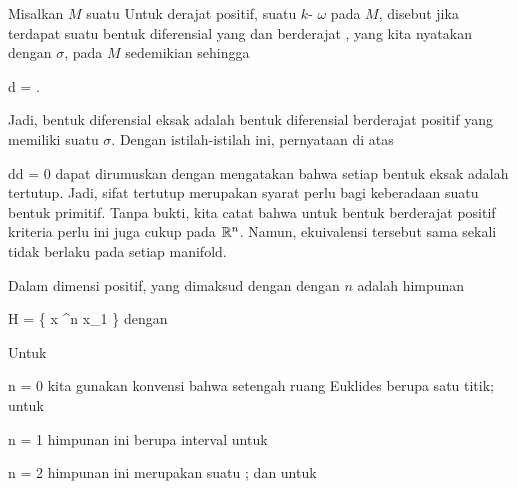 {}
{

Misalkan $M$ suatu
Untuk derajat positif, suatu
$k$-
$\omega$ pada $M$, disebut  jika terdapat suatu bentuk diferensial yang
dan berderajat , yang kita nyatakan dengan $\sigma$, pada $M$ sedemikian sehingga

\mavergleichskette
{\vergleichskette
{ d \sigma
}
{ = }{ \omega
}
{  }{
}
{    }{
}
{   }{
}
}
{}{}{.}

}

Jadi, bentuk diferensial eksak adalah bentuk diferensial berderajat positif yang memiliki suatu  {} $\sigma$. Dengan istilah-istilah ini, pernyataan di atas

\mavergleichskette
{\vergleichskette
{ dd
}
{ = }{ 0
}
{  }{
}
{    }{
}
{   }{
}
}
{}{}{}
dapat dirumuskan dengan mengatakan bahwa setiap bentuk eksak adalah tertutup. Jadi, sifat tertutup merupakan syarat perlu bagi keberadaan suatu bentuk primitif. Tanpa bukti, kita catat bahwa untuk bentuk berderajat positif kriteria perlu ini juga cukup pada ${\mathbb R}^n$. Namun, ekuivalensi tersebut sama sekali tidak berlaku pada setiap manifold.


{}
{

Dalam dimensi positif, yang dimaksud dengan  dengan
 $n$ adalah himpunan

\mavergleichskettedisp
{\vergleichskette
{H
}
{ =} { \left\{  x \in \R^n   \mid   x_1         \right\}
}
{ } {
}
{ } {
}
{ } {
}
}
{}{}{}
dengan

}
Untuk

\mavergleichskette
{\vergleichskette
{ n
}
{ = }{ 0
}
{  }{
}
{    }{
}
{   }{
}
}
{}{}{}
kita gunakan konvensi bahwa setengah ruang Euklides berupa satu titik; untuk

\mavergleichskette
{\vergleichskette
{ n
}
{ = }{ 1
}
{  }{
}
{    }{
}
{   }{
}
}
{}{}{}
himpunan ini berupa interval
\mathl{[0, \infty)}{;} untuk

\mavergleichskette
{\vergleichskette
{ n
}
{ = }{ 2
}
{  }{
}
{    }{
}
{   }{
}
}
{}{}{}
himpunan ini merupakan suatu  {;} dan untuk

